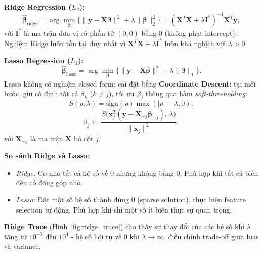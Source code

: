 \medskip
\noindent\textbf{Ridge Regression ($L_2$):}
\begin{equation}
    \hat{\boldsymbol{\beta}}_{\mathrm{ridge}}
    = \arg\min_{\boldsymbol{\beta}} \bigl\{
        \|\mathbf{y} - \mathbf{X}\boldsymbol{\beta}\|^2
        + \lambda\|\boldsymbol{\beta}\|_2^2
      \bigr\}
    = (\mathbf{X}^T\mathbf{X} + \lambda\mathbf{I}^*)^{-1}\mathbf{X}^T\mathbf{y},
    \label{eq:ridge}
\end{equation}
với $\mathbf{I}^*$ là ma trận đơn vị có phần tử $(0,0)$ bằng 0 (không
phạt intercept). Nghiệm Ridge luôn tồn tại duy nhất vì
$\mathbf{X}^T\mathbf{X} + \lambda\mathbf{I}^*$ luôn khả nghịch với
$\lambda > 0$.

\medskip
\noindent\textbf{Lasso Regression ($L_1$):}
\begin{equation}
    \hat{\boldsymbol{\beta}}_{\mathrm{lasso}}
    = \arg\min_{\boldsymbol{\beta}} \bigl\{
        \|\mathbf{y} - \mathbf{X}\boldsymbol{\beta}\|^2
        + \lambda\|\boldsymbol{\beta}\|_1
      \bigr\}.
    \label{eq:lasso}
\end{equation}
Lasso không có nghiệm closed-form; cài đặt bằng \textbf{Coordinate Descent}:
tại mỗi bước, giữ cố định tất cả $\beta_k$ ($k \neq j$), tối ưu
$\beta_j$ thông qua hàm \emph{soft-thresholding}:
\begin{equation}
    S(\rho, \lambda) = \mathrm{sign}(\rho)\max(|\rho| - \lambda, 0),
    \label{eq:soft_threshold}
\end{equation}
\begin{equation}
    \beta_j \leftarrow
    \frac{S\!\bigl(\mathbf{x}_j^T(\mathbf{y} - \mathbf{X}_{-j}\boldsymbol{\beta}_{-j}),\, \lambda\bigr)}
         {\|\mathbf{x}_j\|^2},
    \label{eq:coord_descent}
\end{equation}
với $\mathbf{X}_{-j}$ là ma trận $\mathbf{X}$ bỏ cột $j$.

\textbf{So sánh Ridge và Lasso:}
\begin{itemize}
    \item \textit{Ridge:} Co nhỏ tất cả hệ số về 0 nhưng không bằng 0.
          Phù hợp khi tất cả biến đều có đóng góp nhỏ.
    \item \textit{Lasso:} Đặt một số hệ số thành đúng 0 (sparse solution),
          thực hiện feature selection tự động.
          Phù hợp khi chỉ một số ít biến thực sự quan trọng.
\end{itemize}

\textbf{Ridge Trace} (Hình~\ref{fig:ridge_trace}) cho thấy sự thay đổi của
các hệ số khi $\lambda$ tăng từ $10^{-3}$ đến $10^4$ - hệ số hội tụ về 0
khi $\lambda \to \infty$, điều chỉnh trade-off giữa bias và variance.

